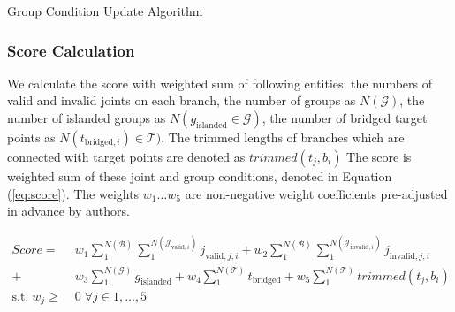 \begin{algorithm}
  \caption{Group Condition Update Algorithm}
  \begin{algorithmic}[1]
    \EndIf

            \EndIf
            \EndIf
          \EndIf
        \EndFor
      \EndFor

      \EndIf
    \EndFor

  \EndFunction
  \end{algorithmic}
  \label{al:connection}
\end{algorithm}

\subsubsection{Score Calculation}
We calculate the score with weighted sum of following entities: the numbers of valid and invalid joints on each branch, the number of groups as $N(\mathcal{G} )$, the number of islanded groups as $N(g_{\text{islanded}} \in \mathcal{G} )$, the number of bridged target points as $N(t_{\text{bridged}, i}) \in \mathcal{T} )$.
The trimmed lengths of branches which are connected with target points are denoted as $trimmed(t_j, b_i)$
The score is weighted sum of these joint and group conditions, denoted in Equation (\ref{eq:score}).
The weights $w_1 \dotso  w_5$ are non-negative weight coefficients pre-adjusted in advance by authors.


\begin{equation} 
 \begin{aligned}
 Score =  &\; w_1  \sum_{1}^{N(\mathcal{B})} \sum_{1}^{N(\mathcal{J}_{\text{valid},i})} j_{\text{valid}, j, i}
 + w_2  \sum_{1}^{N(\mathcal{B})} \sum_{1}^{N(\mathcal{J}_{\text{invalid},i})} j_{\text{invalid}, j, i}\\
+ &\; w_3  \sum_{1}^{N(\mathcal{G})} g_{\text{islanded}}
	 + w_4  \sum_{1}^{N(\mathcal{T})} t_{\text{bridged}}
+  w_5 \sum_{1}^{N(\mathcal{T})} trimmed(t_j, b_i)
 \\
   \textrm{s.t.} \; w_j  \geq  &\;0 \; \forall j \in 1, \dotsc , 5
 \end{aligned}
 \label{eq:score}
\end{equation}
